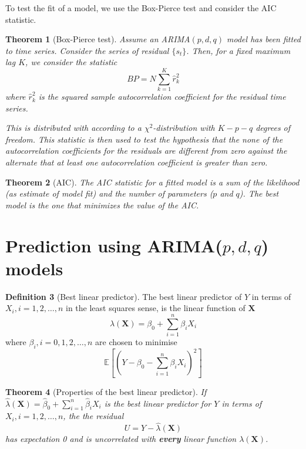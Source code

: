 \documentclass[10pt, oneside, reqno]{amsart}
\theoremstyle{plain}%
\newtheorem{thm}{Theorem}[section]
\theoremstyle{definition}
\newtheorem{defn}[thm]{Definition}
\theoremstyle{remark}
\newcommand{\expc}[1]{\mathbb{E}\left[#1\right]}
\newcommand{\ts}[1]{\{ #1 \}}
\begin{document}
To test the fit of a model, we use the Box-Pierce test and consider the AIC statistic.

\begin{thm}[Box-Pierce test]
    Assume an ARIMA$(p,d,q)$ model has been fitted to time series.  Consider the series of residual $\ts{s_t}$.  Then, for a fixed maximum lag $K$, we consider the statistic \[
        BP = N \sum_{k = 1}^K \hat r_k^2    \] where $\hat r_k^2$ is the squared sample autocorrelation coefficient for the residual time series.

This is distributed with according to a $\chi^2$-distribution with $K - p - q$ degrees of freedom.  
This statistic is then used to test the hypothesis that the none of the autocorrelation coefficients for the residuals are different from zero against the alternate that at least one autocorrelation coefficient is greater than zero.
\end{thm} 


\begin{thm}[AIC]
    The AIC statistic for a fitted model is a sum of the likelihood (as estimate of model fit) and the number of parameters ($p$ and $q$).  The \emph{best} model is the one that minimizes the value of the AIC.
\end{thm}


\section{Prediction using ARIMA($p,d,q$) models} %
\label{sec:prediction_using_arima_p_d_q_models}

\begin{defn}[Best linear predictor]
    The best linear predictor of $Y$ in terms of $X_i, i = 1,2,\dots, n$ in the least squares sense, is the linear function of $\mathbf{X}$\[
        \lambda(\mathbf{X}) = \beta_0 + \sum_{i = 1}^n \beta_i X_i
    \] where $\beta_i, i = 0,1,2,\dots,n$ are chosen to minimise \[
        \expc{\left(Y - \beta_0 - \sum_{i=1}^n \beta_i X_i\right)^2}
    \]
\end{defn}
    
\begin{thm}[Properties of the best linear predictor]
    If $\hat \lambda(\mathbf{X}) = \hat \beta_0 + \sum_{i=1}^n \hat \beta_i X_i$ is the best linear predictor for $Y$ in terms of $X_i, i = 1,2,\dots,n$, the the residual \[
        U = Y - \hat \lambda(\mathbf{X})
    \] has expectation 0 and is uncorrelated with \textbf{every} linear function $\lambda(\mathbf{X})$.
\end{thm}   
\end{document}
